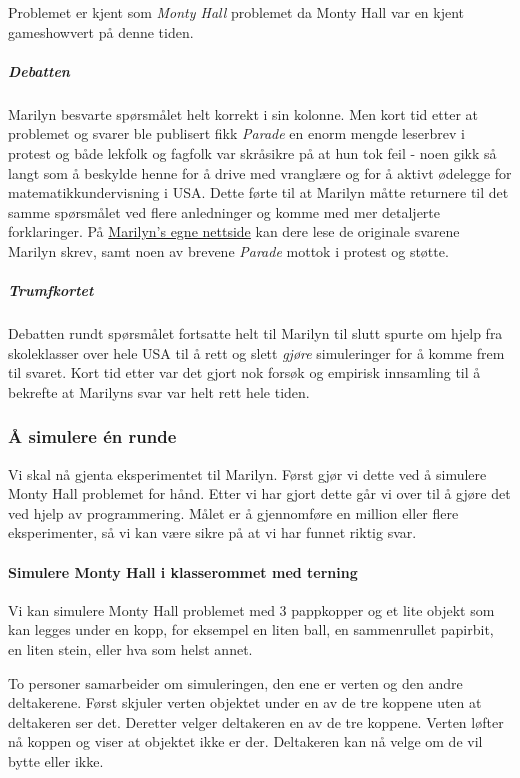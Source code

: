\documentclass[11pt]{article}
\begin{document}
Problemet er kjent som \emph{Monty Hall} problemet da Monty Hall var en
kjent gameshowvert på denne tiden.

\subparagraph{Debatten}\label{debatten}

Marilyn besvarte spørsmålet helt korrekt i sin kolonne. Men kort tid
etter at problemet og svarer ble publisert fikk \emph{Parade} en enorm
mengde leserbrev i protest og både lekfolk og fagfolk var skråsikre på
at hun tok feil - noen gikk så langt som å beskylde henne for å drive
med vranglære og for å aktivt ødelegge for matematikkundervisning i USA.
Dette førte til at Marilyn måtte returnere til det samme spørsmålet ved
flere anledninger og komme med mer detaljerte forklaringer. På
\href{http://marilynvossavant.com/game-show-problem/}{Marilyn's egne
nettside} kan dere lese de originale svarene Marilyn skrev, samt noen av
brevene \emph{Parade} mottok i protest og støtte.

\subparagraph{Trumfkortet}\label{trumfkortet}

Debatten rundt spørsmålet fortsatte helt til Marilyn til slutt spurte om
hjelp fra skoleklasser over hele USA til å rett og slett \emph{gjøre}
simuleringer for å komme frem til svaret. Kort tid etter var det gjort
nok forsøk og empirisk innsamling til å bekrefte at Marilyns svar var
helt rett hele tiden.

    \subsubsection{Å simulere én runde}\label{uxe5-simulere-uxe9n-runde}

Vi skal nå gjenta eksperimentet til Marilyn. Først gjør vi dette ved å
simulere Monty Hall problemet for hånd. Etter vi har gjort dette går vi
over til å gjøre det ved hjelp av programmering. Målet er å gjennomføre
en million eller flere eksperimenter, så vi kan være sikre på at vi har
funnet riktig svar.

    \paragraph{Simulere Monty Hall i klasserommet med
terning}\label{simulere-monty-hall-i-klasserommet-med-terning}

Vi kan simulere Monty Hall problemet med 3 pappkopper og et lite objekt
som kan legges under en kopp, for eksempel en liten ball, en
sammenrullet papirbit, en liten stein, eller hva som helst annet.

To personer samarbeider om simuleringen, den ene er verten og den andre
deltakerene. Først skjuler verten objektet under en av de tre koppene
uten at deltakeren ser det. Deretter velger deltakeren en av de tre
koppene. Verten løfter nå koppen og viser at objektet ikke er der.
Deltakeren kan nå velge om de vil bytte eller ikke.
\end{document}
